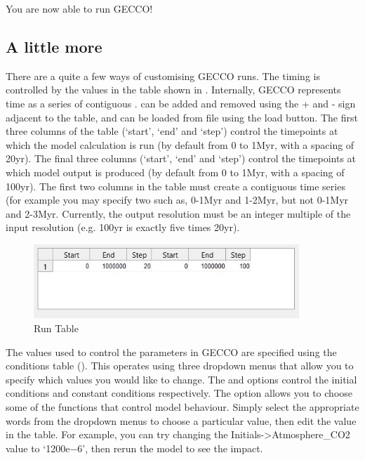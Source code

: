 \documentclass[12pt,twoside,onecolumn,a4paper]{article}
\begin{document}
You are now able to run GECCO!

\subsection{A little more}
There are a quite a few ways of customising GECCO runs. The timing is controlled by the values in the table shown in . Internally, GECCO represents time as a series of contiguous \Chunks. \Chunks can be added and removed using the + and - sign adjacent to the \Chunks table, and can be loaded from file using the load button. The first three columns of the \Chunks table (`start', `end' and `step') control the timepoints at which the model calculation is run (by default from 0 to 1Myr, with a spacing of 20yr). The final three columns (`start', `end' and `step') control the timepoints at which model output is produced (by default from 0 to 1Myr, with a spacing of 100yr). The first two columns in the \Chunks table must create a contiguous time series (for example you may specify two \Chunks such as, 0-1Myr and 1-2Myr, but not 0-1Myr and 2-3Myr. Currently, the output resolution must be an integer multiple of the input resolution (e.g. 100yr is exactly five times 20yr).

\begin{figure}[H]
\centering
\includegraphics[width=10cm]{./Figures/Run_Table.jpg}
\caption{Run Table}
\end{figure}

The values used to control the parameters in GECCO are specified using the conditions table (). This operates using three dropdown menus that allow you to specify which values you would like to change. The \Initials and \Constants options control the initial conditions and constant conditions respectively. The \Functionals option allows you to choose some of the functions that control model behaviour. Simply select the appropriate words from the dropdown menus to choose a particular value, then edit the value in the table. For example, you can try changing the Initials->Atmosphere\_CO2 value to `1200e$-6$', then rerun the model to see the impact.
\end{document}
